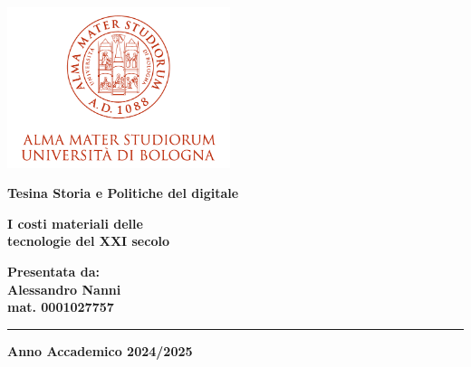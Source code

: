 \documentclass[12pt,a4paper,oneside]{book}
\begin{document}
\pagestyle{empty}

\begin{titlepage}

\begin{center}

\includegraphics[width=6.5cm,height=4.7cm]{img/marchio-di-ateneo.png}

\vspace{15mm}


{\Large{\bf{Tesina Storia e Politiche del digitale}}}

\vspace{15mm}

{\Huge{\bf I costi materiali delle }}\\
\vspace{3mm}
{\Huge{\bf tecnologie del XXI secolo}}\\
\vspace{3mm}
\end{center}

\vspace{20mm}

\hfill
\begin{minipage}[t]{0.40\textwidth}\raggedleft
{\Large{\bf Presentata da: \\ Alessandro Nanni \\ mat. 
 0001027757}}
\end{minipage}

\vspace{90mm}

\rule[0.5cm]{15.8cm}{0.6mm}

\begin{center}
{\large{\bf Anno Accademico 2024/2025\\}}
\end{center}

\end{titlepage}
\end{document}
